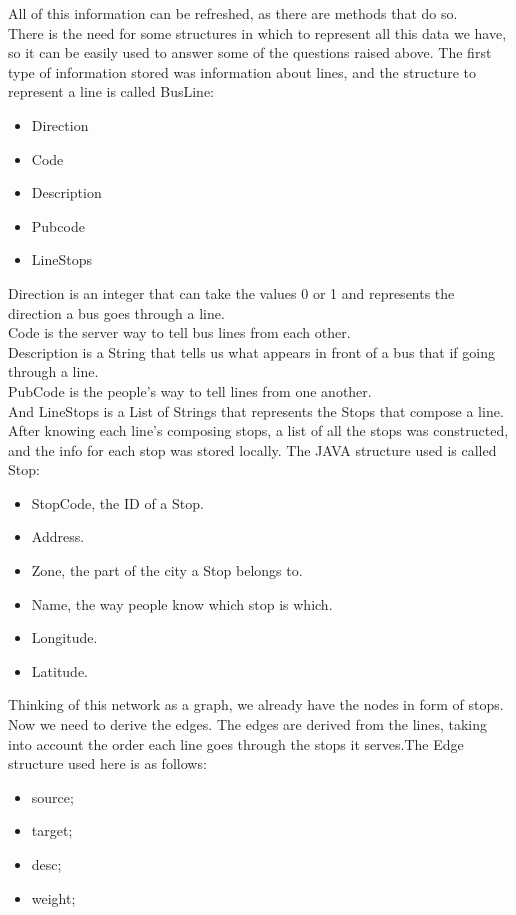 \documentclass[12pt]{article}
\begin{document}
\begin{multicols}{2}
All of this information can be refreshed, as there are methods that do so.\\

There is the need for some structures in which to represent all this data we have, so it can be easily used to answer some of the questions raised above. The first type of information stored was information about lines, and the structure to represent a line is called BusLine:
\begin{itemize}
\item Direction
\item Code
\item Description
\item Pubcode
\item LineStops
\end{itemize}
Direction is an integer that can take the values 0 or 1 and represents the direction a bus goes through a line.\\
Code is the server way to tell bus lines from each other.\\
Description is a String that tells us what appears in front of a bus that if going through a line.\\
PubCode is the people's way to tell lines from one another.\\
And LineStops is a List of Strings that represents the Stops that compose a line.\\

After knowing each line's composing stops, a list of all the stops was constructed, and the info for each stop was stored locally. The JAVA structure used is called Stop:
\begin{itemize}
	\item StopCode, the ID of a Stop.
	\item Address.
	\item Zone, the part of the city a Stop belongs to.
	\item Name, the way people know which stop is which.
	\item Longitude.
	\item Latitude.
\end{itemize}

Thinking of this network as a graph, we already have the nodes in form of stops. Now we need to derive the edges. The edges are derived from the lines, taking into account the order each line goes through the stops it serves.The Edge structure used here is as follows:

\begin{itemize}
	\item source;
	\item target;
	\item desc;
	\item weight;
\end{itemize}


\end{multicols}
\end{document}
